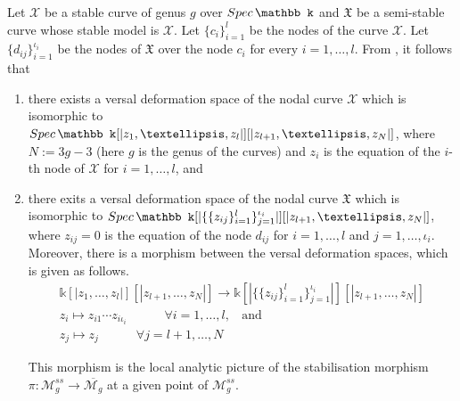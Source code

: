 \documentclass[11pt]{amsart}
\theoremstyle{plain}
\numberwithin{equation}{section}
\newcommand{\spec}{{\rm Spec}\,}
\theoremstyle{definition}
\theoremstyle{plain}
\begin{document}
Let $\mathcal X$ be a stable curve of genus $g$ over $\spec \mathbb k$ and $\mathfrak X$ be a semi-stable curve whose stable model is $\mathcal X$. Let $\{c_i\}^l_{i=1}$ be the nodes of the curve $\mathcal X$. Let $\{d_{ij}\}^{\iota_i}_{i=1}$ be the nodes of $\mathfrak X$ over the node $c_i$ for every $i=1, \dots, l$. From \cite[Proposition 3.3.2]{29}, it follows that 
\begin{enumerate}
\item there exists a versal deformation space of the nodal curve $\mathcal X$ which is isomorphic to $\spec \mathbb k[|z_1, \dots, z_l|][|z_{l+1}, \dots, z_N|]$, where $N:=3g-3$ (here $g$ is the genus of the curves) and $z_i$ is the equation of the $i$-th node of $\mathcal X$ for $i=1, \dots, l$, and 
\item there exits a versal deformation space of the nodal curve $\mathfrak X$ which is isomorphic to $\spec \mathbb k[|\{\{z_{ij}\}^{l}_{i=1}\}^{\iota_i}_{j=1}|][|z_{l+1}, \dots, z_N|]$, where $z_{ij}=0$ is the equation of the node $d_{ij}$ for $i=1, \dots, l$ and $j=1, \dots, \iota_i$. Moreover, there is a morphism between the versal deformation spaces, which is given as follows. 
\begin{align*}
    \mathbb k[|z_1, \dots, z_l|][|z_{l+1}, \dots, z_N|]\longrightarrow \mathbb k[|\{\{z_{ij}\}^{l}_{i=1}\}^{\iota_i}_{j=1}|][|z_{l+1}, \dots, z_N|]\\
    z_i\mapsto z_{i1}\cdots z_{i\iota_i}\hspace{3em}\forall i=1,\dots, l,~~~~\text{and}\\
   z_{j}\mapsto z_j\hspace{3em}\forall j=l+1,\dots, N
\end{align*}

This morphism is the local analytic picture of the stabilisation morphism $\pi: \mathcal M^{ss}_g\longrightarrow \overline{\mathcal M_g}$ at a given point of $\mathcal M^{ss}_g$. 
\end{enumerate}
\end{document}
